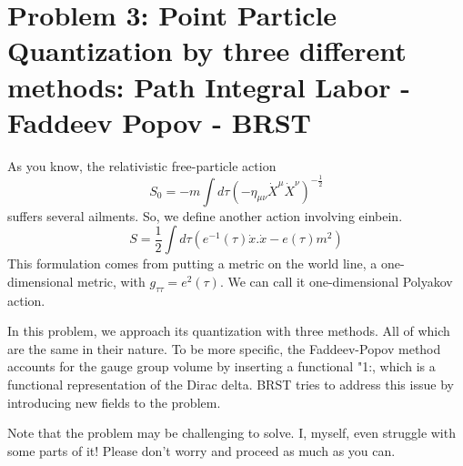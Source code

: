 \documentclass[11pt]{article}
\begin{document}
\section*{Problem 3: Point Particle Quantization by three different methods: Path Integral Labor - Faddeev Popov - BRST}
\begin{problem}
	As you know, the  relativistic free-particle action
	\[
	S_{0} = -m \int d\tau (-\eta_{\mu\nu}\dot{X}^\mu\dot{X}^\nu)^{-\frac12} 
	\] 
	suffers several ailments. So, we define another action involving einbein.
	\[
	S = \frac{1}{2}\int d\tau (e^{-1}(\tau) \dot{x}.\dot{x} - e(\tau) m^2)
	\]
	This formulation comes from putting a metric on the world line, a one-dimensional metric, with $g_{\tau\tau} = e^2(\tau)$. We can call it one-dimensional Polyakov action.
	
	\noindent
	In this problem, we approach its quantization with three methods. All of which are the same in their nature. To be more specific, the Faddeev-Popov method accounts for the gauge group volume by inserting a functional "1:, which is a functional representation of the Dirac delta. BRST tries to address this issue by introducing new fields to the problem.
	
	\noindent
Note that the problem may be challenging to solve. I, myself, even struggle with some parts of it! Please don't worry and proceed as much as you can.
\end{problem}	
\end{document}
